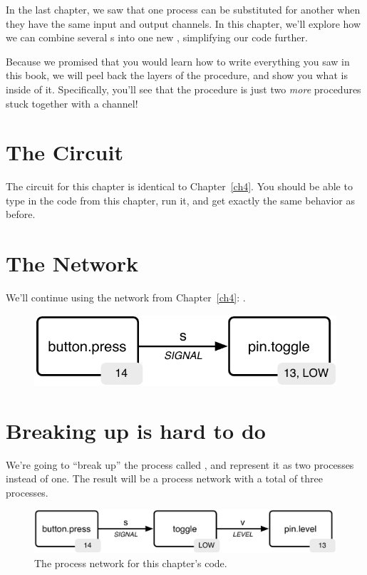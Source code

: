 In the last chapter, we saw that one process can be substituted for another when they have the same input and output channels. In this chapter, we'll explore how we can combine several {\PROCedure}s into one new \PROCedure, simplifying our code further.

Because we promised that you would learn how to write everything you saw in this book, we will peel back the layers of the \tp procedure, and show you what is inside of it. Specifically, you'll see that the \tp procedure is just two {\em more} procedures stuck together with a channel!

\section{The Circuit}
The circuit for this chapter is identical to Chapter~\ref{ch4}. You should be able to type in the code from this chapter, run it, and get exactly the same behavior as before. 

\newpage

\section{The Network}

We'll continue using the network from Chapter~\ref{ch4}: . 

\begin{figure}[ht]
  \begin{center}
    \includegraphics[width=0.8\linewidth]{images/ch4-button-toggle-led}
  \end{center}
\end{figure}

\section{Breaking up is hard to do}

We're going to ``break up'' the process called \tp, and represent it as two processes instead of one. The result will be a process network with a total of three processes.

\begin{figure}[!ht]
  \begin{center}
    \includegraphics[width=\linewidth]{images/ch5-process-network}
    \caption{The process network for this chapter's code.}
    \label{diagram:ch5-process-network}
  \end{center}
\end{figure}

